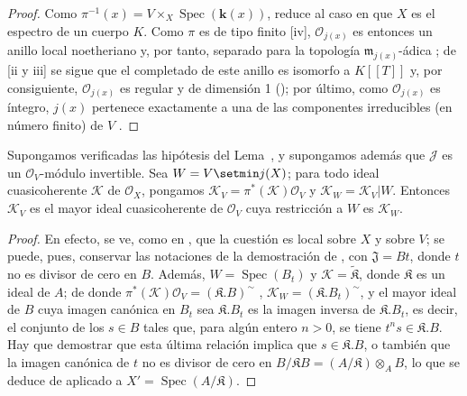 \documentclass[oneside,10pt]{amsart}
\newcommand{\oldpage}[2][]{\marginnote{\normalfont\footnotesize\textbf{#1}~|~#2}\ignorespaces}
\let\EGAOriginalLabel\label
\renewcommand{\label}[1]{\phantomsection\EGAOriginalLabel{#1}}
\begin{document}
\begin{proof}
Como $\pi^{-1}(x)=V\times_X\operatorname{Spec}(\boldsymbol{k}(x))$,  reduce al caso en que $X$ es el espectro de un cuerpo $K$.
Como $\pi$ es de tipo finito [iv], $\mathcal{O}_{j(x)}$ es entonces un anillo local noetheriano y, por tanto, separado para la topología $\mathfrak{m}_{j(x)}$-ádica ;
de [ii y iii] se sigue que el completado de este anillo es isomorfo a $K[[T]]$ y, por consiguiente, $\mathcal{O}_{j(x)}$ es regular y de dimensión 1 (\cite[p.~17-01, th.~1]{I-1});
por último, como $\mathcal{O}_{j(x)}$ es íntegro, $j(x)$ pertenece exactamente a una de las componentes irreducibles (en número finito) de $V$ .
\end{proof}

\begin{corollary}[8.10.4]
\label{II.8.10.4-fr}
Supongamos verificadas las hipótesis del Lema~, y supongamos además que $\mathcal{J}$ es un $\mathcal{O}_V$-módulo invertible.
Sea $W=V\setmin j(X)$;
para todo ideal cuasicoherente $\mathcal{K}$ de $\mathcal{O}_X$, pongamos $\mathcal{K}_V=\pi^*(\mathcal{K})\mathcal{O}_V$ y $\mathcal{K}_W=\mathcal{K}_V|W$.
Entonces $\mathcal{K}_V$ es el mayor ideal cuasicoherente de $\mathcal{O}_V$ cuya restricción a $W$ es $\mathcal{K}_W$.
\end{corollary}

\begin{proof}
En efecto, se ve, como en , que la cuestión es local sobre $X$ y sobre $V$;
se puede, pues, conservar las notaciones de la demostración de , con $\mathfrak{J}=Bt$, donde $t$ no es divisor de cero en $B$.
Además, $W=\operatorname{Spec}(B_t)$ y $\mathcal{K}=\widetilde{\mathfrak{K}}$, donde $\mathfrak{K}$ es un ideal de $A$;
de donde $\pi^*(\mathcal{K})\mathcal{O}_V=(\mathfrak{K}.B)^{\sim}$ , $\mathcal{K}_W=(\mathfrak{K}.B_t)^{\sim}$, y el mayor ideal
\oldpage[II]{187}
de $B$ cuya imagen canónica en $B_t$ sea $\mathfrak{K}.B_t$ es la imagen inversa de $\mathfrak{K}.B_t$, es decir, el conjunto de los $s\in B$ tales que, para algún entero $n>0$, se tiene $t^ns\in\mathfrak{K}.B$.
Hay que demostrar que esta última relación implica que $s\in\mathfrak{K}.B$, o también que la imagen canónica de $t$ no es divisor de cero en $B/\mathfrak{K}B=(A/\mathfrak{K})\otimes_A B$, lo que se deduce de  aplicado a $X'=\operatorname{Spec}(A/\mathfrak{K})$.
\end{proof}
\end{document}
